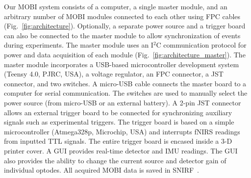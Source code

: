 Our \ac{MOBI} system consists of a computer, a single master module, and an arbitrary number of \ac{MOBI} modules connected to each other using \ac{FPC} cables (Fig.~\ref{fig:architecture}). Optionally, a separate power source and a trigger board can also be connected to the master module to allow synchronization of events during experiments. The master module uses an I$^2$C communication protocol for power and data acquisition of each module (Fig.~\ref{fig:architecture_master}). The master module incorporates a USB-based microcontroller development system (Teensy 4.0, PJRC, USA), a voltage regulator, an \ac{FPC} connector, a \ac{JST} connector, and two switches. A micro-USB cable connects the master board to a computer for serial communication. The switches are used to manually select the power source (from micro-USB or an external battery). A 2-pin \ac{JST} connector allows an external trigger board to be connected for synchronizing auxiliary signals such as experimental triggers. The trigger board is based on a simple microcontroller (Atmega328p, Microchip, USA) and interrupts \ac{fNIRS} readings from inputted \ac{TTL} signals. The entire trigger board is encased inside a 3-D printer cover. A \ac{GUI} provides real-time detector and \ac{IMU} readings. The \ac{GUI} also provides the ability to change the current source and detector gain of individual optodes. All acquired \ac{MOBI} data is saved in \ac{SNIRF}~\cite{snirf2021}. 

